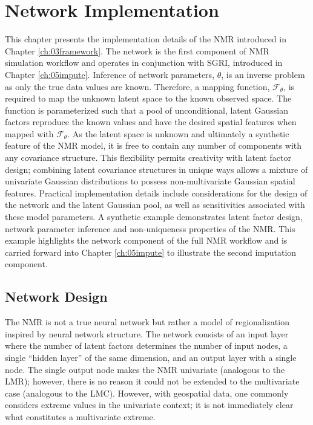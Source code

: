
\chapter{Network Implementation}
\label{ch:04implement}

This chapter presents the implementation details of the \gls{NMR} introduced in Chapter \ref{ch:03framework}. The network is the first component of \gls{NMR} simulation workflow and operates in conjunction with \gls{SGRI}, introduced in Chapter \ref{ch:05impute}. Inference of network parameters, $\theta$, is an inverse problem as only the true data values are known. Therefore, a mapping function, $\mathcal{F}_{\theta}$, is required to map the unknown latent space to the known observed space. The function is parameterized such that a pool of unconditional, latent Gaussian factors reproduce the known values and have the desired spatial features when mapped with $\mathcal{F}_{\theta}$. As the latent space is unknown and ultimately a synthetic feature of the \gls{NMR} model, it is free to contain any number of components with any covariance structure. This flexibility permits creativity with latent factor design; combining latent covariance structures in unique ways allows a mixture of univariate Gaussian distributions to possess non-multivariate Gaussian spatial features. Practical implementation details include considerations for the design of the network and the latent Gaussian pool, as well as sensitivities associated with these model parameters. A synthetic example demonstrates latent factor design, network parameter inference and non-uniqueness properties of the \gls{NMR}. This example highlights the network component of the full \gls{NMR} workflow and is carried forward into Chapter \ref{ch:05impute} to illustrate the second imputation component.

\FloatBarrier
\section{Network Design}
\label{sec:04networkd}

The \gls{NMR} is not a true neural network but rather a model of regionalization inspired by neural network structure. The network consists of an input layer where the number of latent factors determines the number of input nodes, a single ``hidden layer'' of the same dimension, and an output layer with a single node. The single output node makes the \gls{NMR} univariate (analogous to the \gls{LMR}); however, there is no reason it could not be extended to the multivariate case (analogous to the \gls{LMC}). However, with geospatial data, one commonly considers extreme values in the univariate context; it is not immediately clear what constitutes a multivariate extreme.

